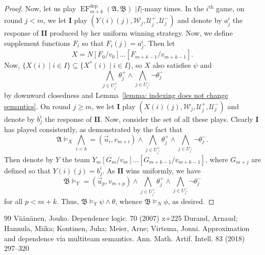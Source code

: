 \documentclass[10pt,a4paper]{amsart}
\newcommand{\playerone}{\mathrm{\mathbf{I}}}
\newcommand{\playertwo}{\mathrm{\mathbf{II}}}
\DeclareMathOperator{\EF}{EF}
\newcommand{\EFdep}{\EF^{\mathrm{dep}}}
\newcommand{\W}{\mathcal W}
\newcommand{\U}{\mathcal U}
\newcommand{\A}{\mathfrak{A}}
\newcommand{\B}{\mathfrak{B}}
\newcommand{\dep}{\mathop{=}}
\begin{document}
\begin{proof}
    Now, let us play $\EFdep_{m+k}(\A,\B)$ $|I|$-many times. In the $i^{\text{th}}$ game, on round $j<m$, we let $\playerone$ play $(Y(i)(j),\W_j,\U^+_j,\U^-_j)$ and denote by $a^i_j$ the response of $\playertwo$ produced by her uniform winning strategy. Now, we define supplement functions $F_i$ so that $F_i(j) = a^i_j$. Then let
    \[
        X = N[F_0/v_0]\dots[F_{m+k-1}/v_{m+k-1}].
    \]
    Now, $\{X(i) \mid i\in I\}\subseteq\{X^*(i) \mid i\in I\}$, so $X$ also satisfies $\psi$ and 
    \[
        \bigwedge_{j\in U^+_{i^*}}\theta^+_j \land \bigwedge_{j\in U^-_{i^*}}\neg\theta^-_j
    \]
    by downward closedness and Lemma~\ref{lemma: indexing does not change semantics}. On round $j\geq m$, we let $\playerone$ play
    $(X(i)(j),\W_j,\U^+_j,\U^-_j)$ and denote by $b^i_j$ the response of $\playertwo$. Now, consider the set of all these plays. Clearly $\playerone$ has played consistently, as demonstrated by the fact that
    \[
        \A\models_X\bigwedge_{i<k}\dep(\vec u_i,v_{m+i})\land\bigwedge_{j\in U^+_{i^*}}\theta^+_j \land \bigwedge_{j\in U^-_{i^*}}\neg\theta^-_j.
    \]
    Then denote by $Y$ the team $Y_m[G_m/v_m]\dots[G_{m+k-1}/v_{m+k-1}]$, where $G_{m+j}$ are defined so that $Y(i)(j) = b^i_j$. As $\playertwo$ wins uniformly, we have
    \[
        \B\models_Y\dep(\vec u_p,v_{m+p})\land\bigwedge_{j\in U^+_{i^*}}\theta^+_j \land \bigwedge_{j\in U^-_{i^*}}\neg\theta^-_j
    \]
    for all $p<m+k$. Thus, $\B\models_Y\psi\land\theta$, whence $\B\models_N\phi$, as desired.
\end{proof}


\begin{thebibliography}{99}
 V\"a\"an\"anen, Jouko. Dependence logic. 70 (2007) x+225
 Durand, Arnaud; Hannula, Miika; Kontinen, Juha; Meier, Arne; Virtema, Jonni. Approximation and dependence via multiteam semantics. Ann. Math. Artif. Intell. 83 (2018) 297--320
\end{thebibliography}
\end{document}
